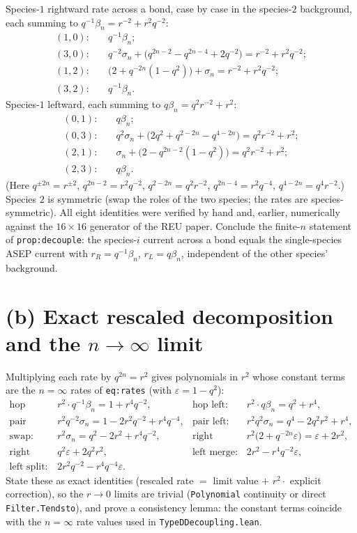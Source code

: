 \documentclass[11pt]{article}
\theoremstyle{plain}
\theoremstyle{remark}
\newcommand{\eps}{\varepsilon}
\begin{document}
Species-$1$ rightward rate across a bond, case by case in the species-$2$ background,
each summing to $q^{-1}\beta_n=r^{-2}+r^2q^{-2}$:
\begin{align*}
  (1,0):&\quad q^{-1}\beta_n; \\
  (3,0):&\quad q^{-2}\sigma_n+\big(q^{2n-2}-q^{2n-4}+2q^{-2}\big)
          = r^{-2}+r^2q^{-2};\\
  (1,2):&\quad \big(2+q^{-2n}(1-q^2)\big)+\sigma_n = r^{-2}+r^2q^{-2};\\
  (3,2):&\quad q^{-1}\beta_n .
\end{align*}
Species-$1$ leftward, each summing to $q\beta_n=q^2r^{-2}+r^2$:
\begin{align*}
  (0,1):&\quad q\beta_n;\\
  (0,3):&\quad q^{2}\sigma_n+\big(2q^2+q^{2-2n}-q^{4-2n}\big)=q^2r^{-2}+r^2;\\
  (2,1):&\quad \sigma_n+\big(2-q^{2n-2}(1-q^2)\big)=q^2r^{-2}+r^2;\\
  (2,3):&\quad q\beta_n .
\end{align*}
(Here $q^{\pm2n}=r^{\pm2}$, $q^{2n-2}=r^2q^{-2}$, $q^{2-2n}=q^2r^{-2}$,
$q^{2n-4}=r^2q^{-4}$, $q^{4-2n}=q^4r^{-2}$.) Species $2$ is symmetric (swap the roles
of the two species; the rates are species-symmetric). All eight identities were
verified by hand and, earlier, numerically against the $16\times16$ generator of the
REU paper. Conclude the finite-$n$ statement of \texttt{prop:decouple}: the
species-$i$ current across a bond equals the single-species ASEP current with
$r_R=q^{-1}\beta_n$, $r_L=q\beta_n$, independent of the other species' background.

\section*{(b) Exact rescaled decomposition and the $n\to\infty$ limit}

Multiplying each rate by $q^{2n}=r^2$ gives polynomials in $r^2$ whose constant
terms are the $n=\infty$ rates of \texttt{eq:rates} (with $\eps=1-q^2$):
\[
\begin{array}{llll}
  \text{hop right:} & r^2\cdot q^{-1}\beta_n = 1+r^4q^{-2}, &
  \text{hop left:} & r^2\cdot q\beta_n = q^2+r^4,\\
  \text{pair right:} & r^2q^{-2}\sigma_n = 1-2r^2q^{-2}+r^4q^{-4}, &
  \text{pair left:} & r^2q^{2}\sigma_n = q^4-2q^2r^2+r^4,\\
  \text{swap:} & r^2\sigma_n = q^2-2r^2+r^4q^{-2}, &
  \text{right merge:} & r^2\big(2+q^{-2n}\eps\big)=\eps+2r^2,\\
  \text{right split:} & q^2\eps+2q^2r^2, &
  \text{left merge:} & 2r^2-r^4q^{-2}\eps,\\
  \text{left split:} & 2r^2q^{-2}-r^4q^{-4}\eps. &&
\end{array}
\]
State these as exact identities (rescaled rate $=$ limit value $+$ $r^2\cdot$
explicit correction), so the $r\to0$ limits are trivial (\texttt{Polynomial}
continuity or direct \texttt{Filter.Tendsto}), and prove a consistency lemma: the
constant terms coincide with the $n=\infty$ rate values used in
\texttt{TypeDDecoupling.lean}.
\end{document}
